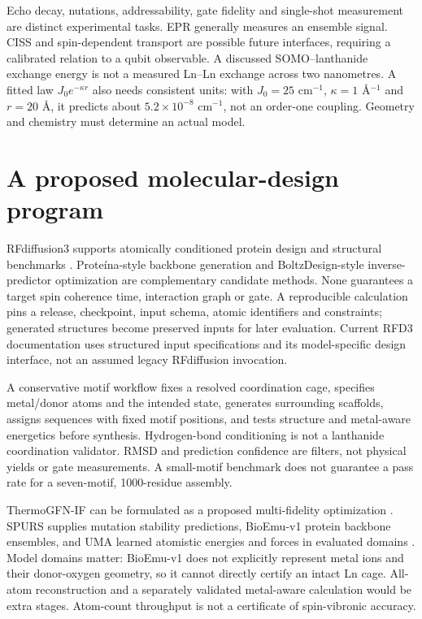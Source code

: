 \documentclass[11pt,oneside,openany]{book}
\theoremstyle{definition}\newtheorem{definition}[theorem]{Definition}
\theoremstyle{remark}\newtheorem{remark}[theorem]{Remark}
\begin{document}
Echo decay, nutations, addressability, gate fidelity and single-shot
measurement are distinct experimental tasks. EPR generally measures an
ensemble signal. CISS and spin-dependent transport are possible future
interfaces, requiring a calibrated relation to a qubit observable.
A discussed SOMO--lanthanide exchange energy is not a measured Ln--Ln
exchange across two nanometres. A fitted law $J_0e^{-\kappa r}$ also needs
consistent units: with $J_0=25$ cm$^{-1}$, $\kappa=1$ \AA$^{-1}$ and
$r=20$ \AA, it predicts about $5.2\times10^{-8}$ cm$^{-1}$, not an
order-one coupling. Geometry and chemistry must determine an actual model.

\section{A proposed molecular-design program}
RFdiffusion3 supports atomically conditioned protein design and structural
benchmarks \cite{PhysRFD3}. Prote\'ina-style backbone generation and
BoltzDesign-style inverse-predictor optimization are complementary candidate
methods. None guarantees a target spin coherence time, interaction graph
or gate. A reproducible calculation pins a release, checkpoint, input
schema, atomic identifiers and constraints; generated structures become
preserved inputs for later evaluation. Current RFD3 documentation uses
structured input specifications and its model-specific design interface,
not an assumed legacy RFdiffusion invocation.

A conservative motif workflow fixes a resolved coordination cage, specifies
metal/donor atoms and the intended state, generates surrounding scaffolds,
assigns sequences with fixed motif positions, and tests structure and
metal-aware energetics before synthesis. Hydrogen-bond conditioning is not
a lanthanide coordination validator. RMSD and prediction confidence are
filters, not physical yields or gate measurements. A small-motif benchmark
does not guarantee a pass rate for a seven-motif, 1000-residue assembly.

ThermoGFN-IF can be formulated as a proposed multi-fidelity optimization
\cite{PhysThermoGFN}. SPURS supplies mutation stability predictions,
BioEmu-v1 protein backbone ensembles, and UMA learned atomistic energies
and forces in evaluated domains \cite{PhysSPURS,PhysBioEmu,PhysUMA}.
Model domains matter: BioEmu-v1 does not explicitly represent metal ions
and their donor-oxygen geometry, so it cannot directly certify an intact
Ln cage. All-atom reconstruction and a separately validated metal-aware
calculation would be extra stages. Atom-count throughput is not a
certificate of spin-vibronic accuracy.
\end{document}
